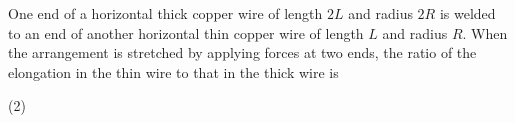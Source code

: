 
\item One end of a horizontal thick copper wire of length $2L$ and radius $2R$ is welded to an end of another horizontal thin copper wire of length $L$ and radius $R$. When the arrangement is stretched by applying forces at two ends, the ratio of the elongation in the thin wire to that in the thick wire is
    \begin{tasks}(2)
    \end{tasks}
